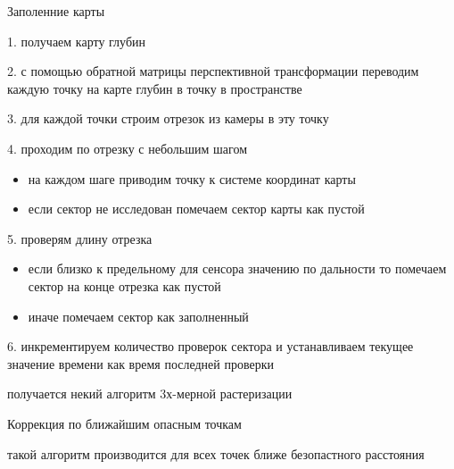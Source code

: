 \begin{docsec}{Заполенние карты}
        \item 1. получаем карту глубин
        \item 2. с помощью обратной матрицы перспективной трансформации
            переводим каждую точку на карте глубин в точку в пространстве
        \item 3. для каждой точки строим отрезок из камеры в эту точку
        \item 4. проходим по отрезку с небольшим шагом
            \begin{itemize}
            \item на каждом шаге приводим точку к системе координат карты
            \item если сектор не исследован помечаем сектор карты как пустой
            \end{itemize}
        \item 5. проверям длину отрезка
            \begin{itemize}
            \item если близко к предельному для сенсора значению по дальности
                то помечаем сектор на конце отрезка как пустой
            \item иначе помечаем сектор как заполненный
            \end{itemize}
        \item 6. инкрементируем количество проверок сектора и
            устанавливаем текущее значение времени как время последней проверки

        \item получается некий алгоритм 3х-мерной растеризации
\end{docsec}

\begin{docsec}{Коррекция по ближайшим опасным точкам}

\item такой алгоритм производится для всех точек ближе безопастного
    расстояния

\end{docsec}

